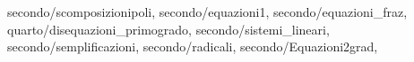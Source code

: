 secondo/scomposizionipoli,
  secondo/equazioni1,
  secondo/equazioni_fraz,
  quarto/disequazioni_primogrado,
 secondo/sistemi_lineari,
	secondo/semplificazioni,
	secondo/radicali,
	secondo/Equazioni2grad,
	